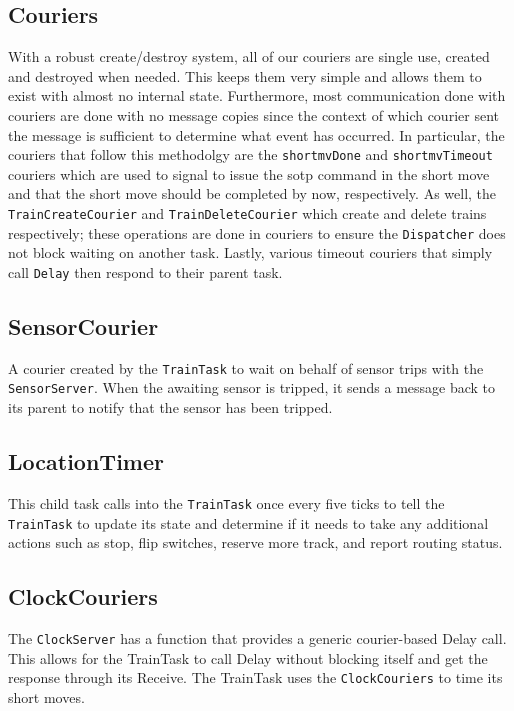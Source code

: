 \documentclass[12pt]{article}
\begin{document}
\subsection{Couriers}
With a robust create/destroy system, all of our couriers are single use, created and destroyed when needed. This keeps them very simple and allows them to exist with almost no internal state. Furthermore, most communication done with couriers are done with no message copies since the context of which courier sent the message is sufficient to determine what event has occurred.  In particular, the couriers that follow this methodolgy are the \texttt{shortmvDone} and \texttt{shortmvTimeout} couriers which are used to signal to issue the sotp command in the short move and that the short move should be completed by now, respectively.  As well, the \texttt{TrainCreateCourier} and \texttt{TrainDeleteCourier} which create and delete trains respectively; these operations are done in couriers to ensure the \texttt{Dispatcher} does not block waiting on another task.  Lastly, various timeout couriers that simply call \texttt{Delay} then respond to their parent task.
\\[1\baselineskip]
\subsection{SensorCourier}
A courier created by the \texttt{TrainTask} to wait on behalf of sensor trips with the \texttt{SensorServer}. When the awaiting sensor is tripped, it sends a message back to its parent to notify that the sensor has been tripped.
\\[1\baselineskip]
\subsection{LocationTimer}
This child task calls into the \texttt{TrainTask} once every five ticks to tell the \texttt{TrainTask} to update its state and determine if it needs to take any additional actions such as stop, flip switches, reserve more track, and report routing status.
\\[1\baselineskip]
\subsection{ClockCouriers}
The \texttt{ClockServer} has a function that provides a generic courier-based Delay call. This allows for the TrainTask to call Delay without blocking itself and get the response through its Receive. The TrainTask uses the \texttt{ClockCouriers} to time its short moves.
\\[1\baselineskip]
\end{document}
